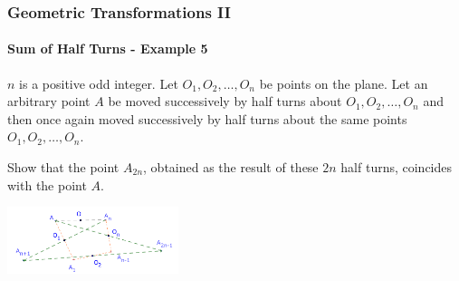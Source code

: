 \documentclass[8pt,xcolor=table,dvipsnames]{beamer}
\begin{document}
\begin{frame}[t]
    \frametitle{Geometric Transformations II}
    \framesubtitle{Sum of Half Turns - Example 5}
    \begin{example}
        $n$ is a positive odd integer. Let $O_1, O_2, \ldots, O_{n}$ be points on the plane.
        Let an arbitrary point $A$ be moved successively by half turns about $O_1, O_2, \ldots, O_{n}$
        and then once again moved successively by half turns about the same points $O_1, O_2, \ldots, O_{n}$.
        
        \bigbreak
        Show that the point $A_{2n}$, obtained as the result of these $2n$ half turns, coincides with the point $A.$
    \end{example}

    \begin{center}
        \includegraphics[width=5cm]{./svg/pdf/translation-2a.pdf}
    \end{center}
\end{frame}
\end{document}
